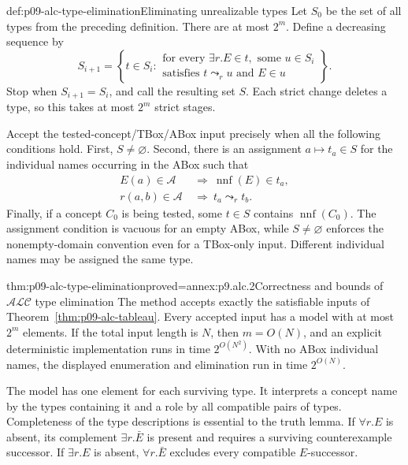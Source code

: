 \begin{hbmethod}{def:p09-alc-type-elimination}{Eliminating unrealizable types}
Let \(S_0\) be the set of all types from the preceding definition.
There are at most \(2^m\).
Define a decreasing sequence by
\[
 S_{i+1}=
 \left\{t\in S_i:
 \begin{array}{l}
  \text{for every }\exists r.E\in t,\text{ some }u\in S_i\\
  \text{satisfies }t\leadsto_r u\text{ and }E\in u
 \end{array}\right\}.
\]
Stop when \(S_{i+1}=S_i\), and call the resulting set \(S\).
Each strict change deletes a type, so this takes at most \(2^m\)
strict stages.

Accept the tested-concept/TBox/ABox input precisely when all the
following conditions hold.
First, \(S\ne\varnothing\).
Second, there is an assignment \(a\mapsto t_a\in S\) for the
individual names occurring in the ABox such that
\[
\begin{aligned}
 E(a)\in\mathcal A&\ \Longrightarrow\
                         \operatorname{nnf}(E)\in t_a,\\
 r(a,b)\in\mathcal A&\ \Longrightarrow\
                         t_a\leadsto_r t_b.
\end{aligned}
\]
Finally, if a concept \(C_0\) is being tested, some \(t\in S\)
contains \(\operatorname{nnf}(C_0)\).
The assignment condition is vacuous for an empty ABox, while
\(S\ne\varnothing\) enforces the nonempty-domain convention even
for a TBox-only input.
Different individual names may be assigned the same type.
\end{hbmethod}

\begin{hbtheorem}{thm:p09-alc-type-elimination}{proved=annex:p9.alc.2}{Correctness and bounds of \(\mathcal{ALC}\) type elimination}
The method accepts exactly the satisfiable inputs of
Theorem~\ref{thm:p09-alc-tableau}.
Every accepted input has a model with at most \(2^m\) elements.
If the total input length is \(N\), then \(m=O(N)\), and an explicit
deterministic implementation runs in time \(2^{O(N^2)}\).
With no ABox individual names, the displayed enumeration and elimination
run in time \(2^{O(N)}\).
\end{hbtheorem}

The model has one element for each surviving type.
It interprets a concept name by the types containing it and a role
by all compatible pairs of types.
Completeness of the type descriptions is essential to the truth lemma.
If \(\forall r.E\) is absent, its complement \(\exists r.\bar E\)
is present and requires a surviving counterexample successor.
If \(\exists r.E\) is absent, \(\forall r.\bar E\) excludes every
compatible \(E\)-successor.

